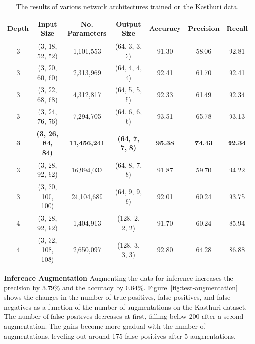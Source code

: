 \begin{table}
	\scriptsize
	\centering
	\begin{tabular}{c c c c c c c}
		\hline
		\textbf{Depth} & \textbf{Input Size} & \textbf{No. Parameters} & \textbf{Output Size} & \textbf{Accuracy} & \textbf{Precision} & \textbf{Recall} \\ \hline
		      3        & (3, 18, 52, 52)     & 1,101,553               & (64, 3, 3, 3)        & 91.30             & 58.06              & 92.81 \\
		      3        & (3, 20, 60, 60)     & 2,313,969               & (64, 4, 4, 4)        & 92.41             & 61.70              & 92.41 \\
		      3        & (3, 22, 68, 68)     & 4,312,817               & (64, 5, 5, 5)        & 92.33             & 61.49              & 92.34 \\
		      3        & (3, 24, 76, 76)     & 7,294,705               & (64, 6, 6, 6)        & 93.51             & 65.78              & 93.13 \\
		      \textbf{3}        & \textbf{(3, 26, 84, 84)}     & \textbf{11,456,241}              & \textbf{(64, 7, 7, 8)}        & \textbf{95.38}             & \textbf{74.43}              & \textbf{92.34} \\
		      3        & (3, 28, 92, 92)     & 16,994,033              & (64, 8, 7, 8)        & 91.87             & 59.70              & 94.22 \\
		      3        & (3, 30, 100, 100)   & 24,104,689              & (64, 9, 9, 9)        & 92.01             & 60.24              & 93.75 \\
		      4        & (3, 28, 92, 92)     & 1,404,913               & (128, 2, 2, 2)       & 91.70             & 60.24             & 85.94 \\
		      4        & (3, 32, 108, 108)   & 2,650,097               & (128, 3, 3, 3)       & 92.80             & 64.28              & 86.88 \\\hline
	\end{tabular}
	\caption{The results of various network architectures trained on the Kasthuri data.}
	\label{table:input-size}
\end{table}

\noindent
\textbf{Inference Augmentation}
Augmenting the data for inference increases the precision by 3.79\% and the accuracy by 0.64\%. 
Figure~\ref{fig:test-augmentation} shows the changes in the number of true positives, false positives, and false negatives as a function of the number of augmentations on the Kasthuri dataset.
The number of false positives decreases at first, falling below 200 after a second augmentation.
The gains become more gradual with the number of augmentations, leveling out around 175 false positives after 5 augmentations.

